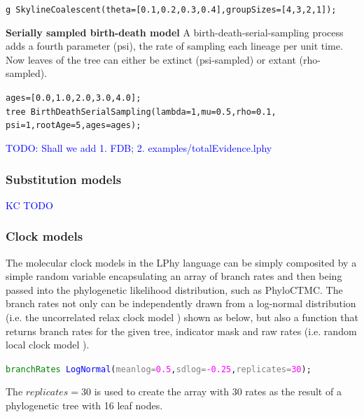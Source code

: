 \documentclass[10pt,letterpaper,table]{article}
\begin{document}
{{\small
  \begin{alltt}
    g ~ SkylineCoalescent(theta=[0.1, 0.2, 0.3, 0.4], groupSizes=[4,3,2,1]);
  \end{alltt}
}

\noindent{} \textbf{Serially sampled birth-death model}
\newline
A birth-death-serial-sampling \cite{stadler2013dating} process adds a fourth parameter (psi), the rate of sampling each lineage per unit time.
Now leaves of the tree can either be extinct (psi-sampled) or extant (rho-sampled).
{\small
  \begin{alltt}
    ages = [0.0,1.0,2.0,3.0,4.0];
    tree ~ BirthDeathSerialSampling(lambda=1, mu=0.5, rho=0.1, 
                                    psi=1, rootAge=5, ages=ages);
  \end{alltt}
}

\textcolor{blue}{TODO: Shall we add 1. FDB; 2. examples/totalEvidence.lphy}



\subsubsection{Substitution models}
\textcolor{blue}{KC TODO}


\subsubsection{Clock models}
\label{sec:clockmodels}
The molecular clock models in the LPhy language can be simply composited by a simple random variable encapsulating an array of branch rates and then being passed into the phylogenetic likelihood distribution, such as PhyloCTMC. The branch rates not only can be independently drawn from a log-normal distribution (i.e. the uncorrelated relax clock model \cite{drummond2006relaxedconfidence}) shown as below, but also a function that returns branch rates for the given tree, indicator mask and raw rates (i.e. random local clock model \cite{}). 

{\small
\begin{alltt}
    \textcolor{green}{branchRates} ~ \textcolor{blue}{LogNormal}(\textcolor{gray}{meanlog=}\textcolor{magenta}{0.5}, \textcolor{gray}{sdlog=}\textcolor{magenta}{-0.25}, \textcolor{gray}{replicates=}\textcolor{magenta}{30});
\end{alltt}
}

The $replicates=30$ is used to create the array with 30 rates as the result of a phylogenetic tree with 16 leaf nodes.

}
\end{document}

